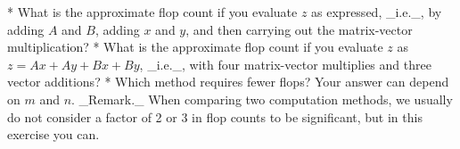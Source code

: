 * What is the approximate flop count if you evaluate \(z\) as expressed, _i.e._, by adding \(A\) and \(B\), adding \(x\) and \(y\), and then carrying out the matrix-vector multiplication?
* What is the approximate flop count if you evaluate \(z\) as \(z=Ax+Ay+Bx+By\), _i.e._, with four matrix-vector multiplies and three vector additions?
* Which method requires fewer flops? Your answer can depend on \(m\) and \(n\). _Remark._ When comparing two computation methods, we usually do not consider a factor of 2 or 3 in flop counts to be significant, but in this exercise you can.

